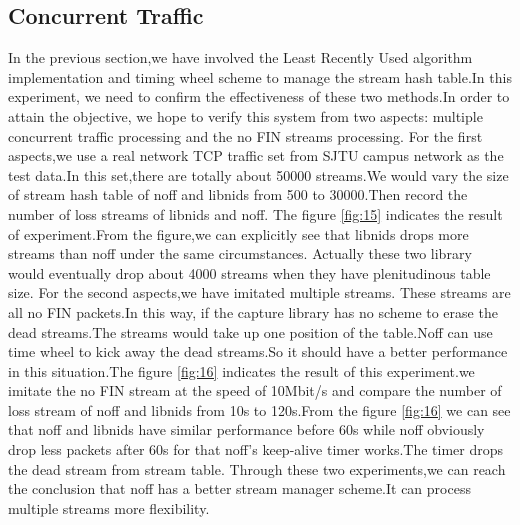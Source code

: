 \documentclass[conference]{IEEEtran}
\begin{document}
\subsection{Concurrent Traffic}
In the previous section,we have involved the Least Recently Used algorithm implementation and timing wheel scheme to manage the stream hash table.In this experiment, we need to confirm the effectiveness of these two methods.In order to attain the objective, we hope to verify this system from two aspects: multiple concurrent traffic processing and the no FIN streams processing.
\newline\indent For the first aspects,we use a real network TCP traffic set from SJTU campus network as the test data.In this set,there are totally about 50000 streams.We would vary the size of stream hash table of noff and libnids from 500 to 30000.Then record the number of loss streams of libnids and noff.
The figure \ref{fig:15} indicates the result of experiment.From the figure,we can explicitly see that libnids drops more streams than noff under the same circumstances. Actually these two library would eventually drop about 4000 streams when they have plenitudinous table size. 
\newline\indent For the second aspects,we have imitated multiple streams. These streams are all no FIN packets.In this way, if the capture library has no scheme to erase the dead streams.The streams would take up one position of 
the table.Noff can use time wheel to kick away the dead streams.So it should have a better performance in this situation.The figure \ref{fig:16} indicates the result of this experiment.we imitate the no FIN stream at the speed of 10Mbit/s and compare the number of loss stream of noff and libnids from 10s to 
120s.From the figure \ref{fig:16} we can see that noff and libnids have similar performance before 60s while noff obviously drop less packets after 60s for that noff's keep-alive timer works.The timer drops the dead stream from stream table.
\newline\indent Through these two experiments,we can reach the conclusion that noff has a better stream manager scheme.It can process multiple streams more flexibility.
\end{document}
